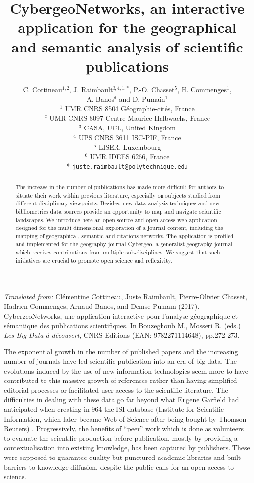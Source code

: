 \documentclass[11pt]{article}
\title{CybergeoNetworks, an interactive application for the geographical and semantic analysis of scientific publications}
\author{C. Cottineau$^{1,2}$, J. Raimbault$^{3,4,1,\ast}$, P.-O. Chasset$^{5}$, H. Commenges$^{1}$,\\
A. Banos$^{6}$ and D. Pumain$^{1}$\medskip\\
$^{1}$ UMR CNRS 8504 G{\'e}ographie-cit{\'e}s, France\\
$^{2}$ UMR CNRS 8097 Centre Maurice Halbwachs, France\\
$^{3}$ CASA, UCL, United Kingdom\\
$^{4}$ UPS CNRS 3611 ISC-PIF, France\\
$^{5}$ LISER, Luxembourg\\
$^{6}$ UMR IDEES 6266, France\medskip\\
$\ast$ \texttt{juste.raimbault@polytechnique.edu}
}
\date{}
\begin{document}
{\justify \textit{Translated from: }Cl{\'e}mentine Cottineau, Juste Raimbault, Pierre-Olivier Chasset, Hadrien Commenges, Arnaud Banos, and Denise Pumain (2017). CybergeoNetworks, une application interactive pour l'analyse g{\'e}ographique et s{\'e}mantique des publications scientifiques. In Bouzeghoub M., Mosseri R. (eds.) \textit{Les Big Data {\`a} d{\'e}couvert}, CNRS Editions (EAN: 9782271114648), pp.272-273.}


{\let\newpage\relax\maketitle}

\begin{abstract}
	The increase in the number of publications has made more difficult for authors to situate their work within previous literature, especially on subjects studied from different disciplinary viewpoints. Besides, new data analysis techniques and new bibliometrics data sources provide an opportunity to map and navigate scientific landscapes. We introduce here an open-source and open-access web application designed for the multi-dimensional exploration of a journal content, including the mapping of geographical, semantic and citations networks. The application is profiled and implemented for the geography journal Cybergeo, a generalist geography journal which receives contributions from multiple sub-disciplines. We suggest that such initiatives are crucial to promote open science and reflexivity.
\end{abstract}


\bigskip


The exponential growth in the number of published papers and the increasing number of journals have led scientific publication into an era of big data. The evolutions induced by the use of new information technologies seem more to have contributed to this massive growth of references rather than having simplified editorial processes or facilitated user access to the scientific literature. The difficulties in dealing with these data go far beyond what Eugene Garfield had anticipated when creating in 964 the ISI database (Institute for Scientific Information, which later became Web of Science after being bought by Thomson Reuters) \citep{garfield1970citation}. Progressively, the benefits of ``peer'' work which is done as volunteers to evaluate the scientific production before publication, mostly by providing a contextualisation into existing knowledge, has been captured by publishers. These were supposed to guarantee quality but punctured academic libraries and built barriers to knowledge diffusion, despite the public calls for an open access to science.
\end{document}
